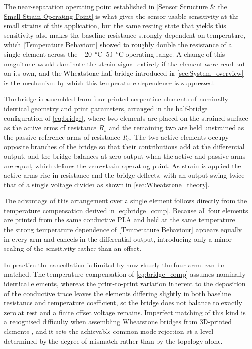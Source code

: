 The near-separation operating point established in \cref{Sensor Structure & the Small-Strain Operating Point} is what gives the sensor usable sensitivity at the small strains of this application, but the same resting state that yields this sensitivity also makes the baseline resistance strongly dependent on temperature, which \cref{Temperature Behaviour} showed to roughly double the resistance of a single element across the \SIrange{-20}{50}{\celsius} operating range. A change of this magnitude would dominate the strain signal entirely if the element were read out on its own, and the Wheatstone half-bridge introduced in \cref{sec:System_overview} is the mechanism by which this temperature dependence is suppressed.

The bridge is assembled from four printed serpentine elements of nominally identical geometry and print parameters, arranged in the half-bridge configuration of \cref{eq:bridge}, where two elements are placed on the strained surface as the active arms of resistance $R_s$ and the remaining two are held unstrained as the passive reference arms of resistance $R_b$. The two active elements occupy opposite branches of the bridge so that their contributions add at the differential output, and the bridge balances at zero output when the active and passive arms are equal, which defines the zero-strain operating point. As strain is applied the active arms rise in resistance and the bridge deflects, with an output swing twice that of a single voltage divider as shown in \cref{sec:Wheatstone_theory}.

The advantage of this arrangement over a single element follows directly from the temperature compensation derived in \cref{eq:bridge_comp}. Because all four elements are printed from the same conductive PLA and held at the same temperature, the strong temperature dependence of \cref{Temperature Behaviour} appears equally in every arm and cancels in the differential output, introducing only a minor scaling of the sensitivity rather than an offset.

In practice the cancellation is limited by how closely the four arms can be matched. The temperature compensation of \cref{eq:bridge_comp} assumes nominally identical elements, whereas the print-to-print variation inherent to the deposition of the conductive trace leaves the elements differing slightly in both baseline resistance and temperature coefficient, so the bridge does not balance to exactly zero at rest and a finite offset voltage remains. Imperfect matching of this kind is a recognised difficulty when assembling Wheatstone bridges from 3D-printed elements \cite{3DprintWheatstoneStrain}, and it sets the achievable common-mode rejection at a level determined by the degree of mismatch rather than by the topology alone. 

